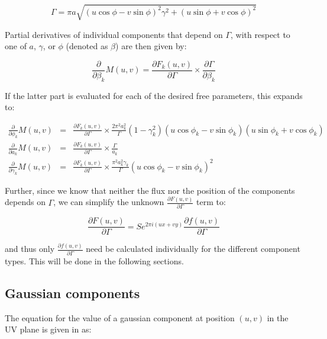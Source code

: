 \documentclass[11pt]{article}
\begin{document}
\begin{equation}
\Gamma = \pi a \sqrt{(u\cos{\phi}-v\sin{\phi})^{2}\gamma^{2}+(u\sin{\phi}+v\cos{\phi})^{2}}
\end{equation}

Partial derivatives of individual components that depend on $\Gamma$,
with respect to one of $a$, $\gamma$, or $\phi$ (denoted as $\beta$) are
then given by: 

\begin{equation}
\frac{\partial}{\partial \beta_{k}} M(u,v) = \frac{\partial F_{k}(u,v)}{\partial\Gamma} \times \frac{\partial\Gamma}{\partial\beta_{k}}
\end{equation}

If the latter part is evaluated for each of the desired free
parameters, this expands to:

\begin{eqnarray}
%
\label{par_phi}
\frac{\partial}{\partial\phi_{k}} M(u,v) & = & \frac{\partial
F_{k}(u,v)}{\partial\Gamma} \times \frac{2\pi^{2}a_{k}^{2}}{\Gamma} (1-\gamma_{k}^{2})
(u\cos{\phi_{k}}-v\sin{\phi_{k}})(u\sin{\phi_{k}}+v\cos{\phi_{k}}) \\
%
\frac{\partial}{\partial a_{k}} M(u,v) & = & \frac{\partial
F_{k}(u,v)}{\partial\Gamma} \times \frac{\Gamma}{a_{k}} \\
%
\frac{\partial}{\partial \gamma_{k}} M(u,v) & = & \frac{\partial
F_{k}(u,v)}{\partial\Gamma} \times \frac{\pi^{2}a_{k}^{2}\gamma_{k}}{\Gamma} 
(u\cos{\phi_{k}}-v\sin{\phi_{k}})^{2}
\end{eqnarray}

Further, since we know that neither the flux nor the position of the
components depends on $\Gamma$, we can simplify the unknown
$\frac{\partial F(u,v)}{\partial\Gamma}$ term to:

\begin{equation}
\frac{\partial F(u,v)}{\partial\Gamma} = S e^{2 \pi i (u x + v y)}
\frac{\partial f(u,v)}{\partial\Gamma}
\end{equation}

and thus only $\frac{\partial f(u,v)}{\partial\Gamma}$ need be
calculated individually for the different component types. This will
be done in the following sections.

\subsection{Gaussian components}

The equation for the value of a gaussian component at position $(u,v)$
in the UV plane is given in \cite{tjp91} as:
\end{document}
